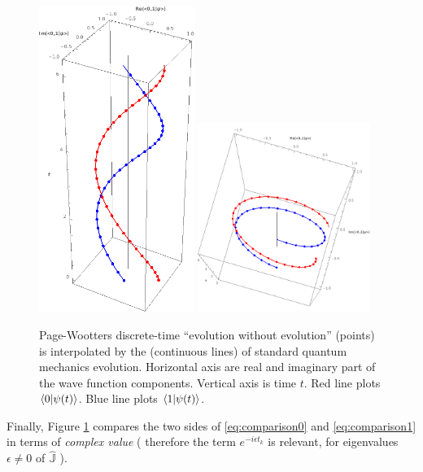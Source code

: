 \begin{figure}
  \centering
  \includegraphics[width=0.45\textwidth]{img/PWfit32.png}
  \includegraphics[width=0.5\textwidth]{img/PWfit32top.png}
  \caption[
    P-W vs Schr{\"o}dinger evolution (complex values)
  ]{
    Page-Wootters discrete-time ``evolution without evolution'' (points)
    is interpolated by the (continuous lines) of standard quantum mechanics
    evolution.
    Horizontal axis are real and imaginary part of the wave function components.
    Vertical axis is time $t$.
    Red   line plots {\color{red}   $\braket{0}{\psi(t)}$}.
    Blue  line plots {\color{blue}  $\braket{1}{\psi(t)}$}.
  }
  \label{fig:complex-comparison}
\end{figure}

Finally, Figure \ref{fig:complex-comparison} compares the two sides of
\eqref{eq:comparison0} and \eqref{eq:comparison1}
in terms of \emph{complex value}
(%
  therefore the term $e^{-i \epsilon t_k}$ is relevant,
  for eigenvalues $\epsilon \neq 0$ of $\hat{\mathbb{J}}$%
).
